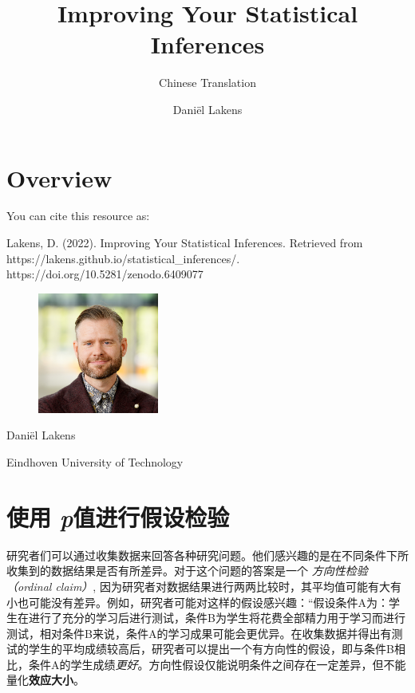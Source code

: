 \documentclass[
  letterpaper,
  DIV=11,
  numbers=noendperiod]{scrreprt}
\title{Improving Your Statistical Inferences}
\subtitle{Chinese Translation}
\author{Daniël Lakens}
\date{}
\renewcommand*\contentsname{Table of contents}
\newcommand\contentsname{Table of contents}
\begin{document}
\maketitle
\ifdefined\Shaded\renewenvironment{Shaded}{\begin{tcolorbox}[borderline west={3pt}{0pt}{shadecolor}, enhanced, frame hidden, boxrule=0pt, interior hidden, breakable, sharp corners]}{\end{tcolorbox}}\fi

\renewcommand*\contentsname{Table of contents}
{
\hypersetup{linkcolor=}
\setcounter{tocdepth}{2}
\tableofcontents
}

\hypertarget{overview}{%
\chapter*{Overview}\label{overview}}


You can cite this resource as:

Lakens, D. (2022). Improving Your Statistical Inferences. Retrieved from
https://lakens.github.io/statistical\_inferences/.
https://doi.org/10.5281/zenodo.6409077

\begin{figure}

\includegraphics[width=1.5625in,height=\textheight]{images/me.png} \hfill{}

\end{figure}

Daniël Lakens

Eindhoven University of Technology


\hypertarget{sec-pvalue}{%
\chapter{\texorpdfstring{使用
\emph{p}值进行假设检验}{使用 p值进行假设检验}}\label{sec-pvalue}}

研究者们可以通过收集数据来回答各种研究问题。他们感兴趣的是在不同条件下所收集到的数据结果是否有所差异。对于这个问题的答案是一个
\emph{方向性检验（ordinal claim）},
因为研究者对数据结果进行两两比较时，其平均值可能有大有小也可能没有差异。例如，研究者可能对这样的假设感兴趣：``假设条件A为：学生在进行了充分的学习后进行测试，条件B为学生将花费全部精力用于学习而进行测试，相对条件B来说，条件A的学习成果可能会更优异。在收集数据并得出有测试的学生的平均成绩较高后，研究者可以提出一个有方向性的假设，即与条件B相比，条件A的学生成绩\emph{更好}。方向性假设仅能说明条件之间存在一定差异，但不能量化\textbf{效应大小}。
\end{document}
